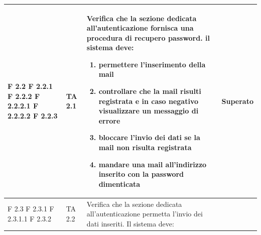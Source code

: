 \documentclass[a4paper,11pt]{article}
\begin{document}
\begin{longtable}{p{}p{}p{}p{}}
F 2.2 \newline F 2.2.1 \newline F 2.2.2 \newline F 2.2.2.1 \newline F 2.2.2.2 \newline F 2.2.3&TA 2.1&Verifica che la sezione dedicata all'autenticazione fornisca una procedura di recupero password. il sistema deve:
\begin{enumerate}
\item permettere l'inserimento della mail
\item controllare che la mail risulti registrata e in caso negativo visualizzare un messaggio di errore
\item bloccare l'invio dei dati se la mail non risulta registrata
\item mandare una mail all'indirizzo inserito con la password dimenticata
\end{enumerate} & Superato\\
\midrule
F 2.3 \newline F 2.3.1 \newline F 2.3.1.1 \newline F 2.3.2 & TA 2.2& Verifica che la sezione dedicata all'autenticazione permetta l'invio dei dati inseriti. Il sistema deve: 

\end{longtable}
\end{document}
